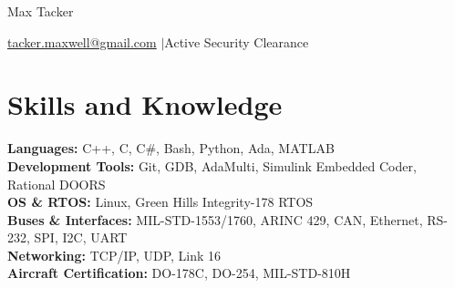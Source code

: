 \documentclass[11pt]{article}       %
\begin{document}
\centerline{\Huge Max Tacker}

\vspace{5pt}

\centerline{\href{mailto:tacker.maxwell@gmail.com}{tacker.maxwell@gmail.com} \quad$|$\quad Active Security Clearance}

\vspace{-10pt}

\section*{Skills and Knowledge}
\textbf{Languages:} C++, C, C\#, Bash, Python, Ada, MATLAB\\
\textbf{Development Tools:} Git, GDB, AdaMulti, Simulink Embedded Coder, Rational DOORS\\
\textbf{OS \& RTOS:} Linux, Green Hills Integrity-178 RTOS\\
\textbf{Buses \& Interfaces:} MIL-STD-1553/1760, ARINC 429, CAN, Ethernet, RS-232, SPI, I2C, UART\\
\textbf{Networking:} TCP/IP, UDP, Link 16\\
\textbf{Aircraft Certification:} DO-178C, DO-254, MIL-STD-810H\\

\vspace{-6.5pt}

\end{document}
